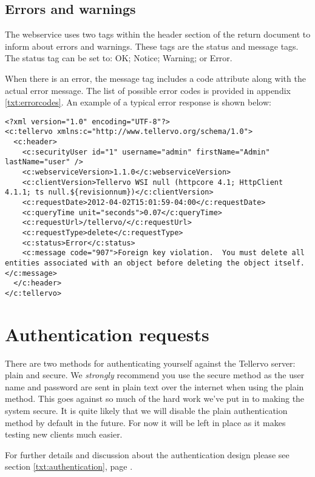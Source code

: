 \subsection{Errors and warnings}
\label{txt:errorsandwarnings}
The webservice uses two tags within the header section of the return document to inform about errors and warnings.  These tags are the status and message tags.  The status tag can be set to: OK; Notice; Warning; or Error.  

When there is an error, the message tag includes a code attribute along with the actual error message.  The list of possible error codes is provided in appendix \ref{txt:errorcodes}.  An example of a typical error response is shown below:

\begin{lstlisting}
<?xml version="1.0" encoding="UTF-8"?>
<c:tellervo xmlns:c="http://www.tellervo.org/schema/1.0">
  <c:header>
    <c:securityUser id="1" username="admin" firstName="Admin" lastName="user" />
    <c:webserviceVersion>1.1.0</c:webserviceVersion>
    <c:clientVersion>Tellervo WSI null (httpcore 4.1; HttpClient 4.1.1; ts null.${revisionnum})</c:clientVersion>
    <c:requestDate>2012-04-02T15:01:59-04:00</c:requestDate>
    <c:queryTime unit="seconds">0.07</c:queryTime>
    <c:requestUrl>/tellervo/</c:requestUrl>
    <c:requestType>delete</c:requestType>
    <c:status>Error</c:status>
    <c:message code="907">Foreign key violation.  You must delete all entities associated with an object before deleting the object itself.</c:message>
  </c:header>
</c:tellervo>
\end{lstlisting}


\section{Authentication requests}
There are two methods for authenticating yourself against the Tellervo server: plain and secure.  We \emph{strongly} recommend you use the secure method as the user name and password are sent in plain text over the internet when using the plain method.  This goes against so much of the hard work we've put in to making the system secure.  It is quite likely that we will disable the plain authentication method by default in the future.  For now it will be left in place as it makes testing new clients much easier.  

For further details and discussion about the authentication design please see section \ref{txt:authentication}, page \pageref{txt:authentication}.

